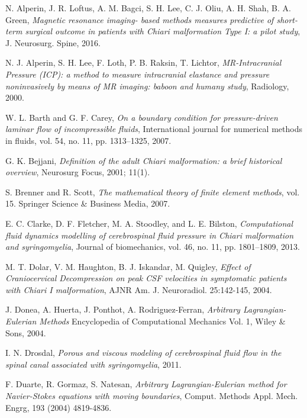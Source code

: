 \documentclass[a4paper,11pt,openright,twoside]{book}
\begin{document}
\begin{thebibliography}{100}

 N. Alperin, J. R. Loftus, A. M. Bagci, S. H. Lee, C. J. Oliu, A. H. Shah, B. A. Green, \emph{Magnetic resonance imaging- based methods measures predictive of short-term surgical outcome in patients with Chiari malformation Type I: a pilot study}, J. Neurosurg. Spine, 2016.

 N. J. Alperin, S. H. Lee, F. Loth, P. B. Raksin, T. Lichtor, \emph{MR-Intracranial Pressure (ICP): a method to measure intracranial elastance and pressure noninvasively by means of MR imaging: baboon and humany study}, Radiology, 2000.

 W. L. Barth and G. F. Carey, \emph{On a boundary condition for pressure-driven laminar flow of incompressible fluids}, International journal for numerical methods in fluids, vol. 54, no. 11, pp. 1313–1325, 2007.


 G. K. Bejjani, \emph{Definition of the adult Chiari malformation: a brief historical overview}, Neurosurg Focus, 2001; 11(1).

 S. Brenner and R. Scott, \emph{The mathematical theory of finite element methods}, vol. 15. Springer Science \& Business Media, 2007.

 E. C. Clarke, D. F. Fletcher, M. A. Stoodley, and L. E. Bilston, \emph{Computational fluid dynamics modelling of cerebrospinal fluid pressure in Chiari malformation and syringomyelia}, Journal of biomechanics, vol. 46, no. 11, pp. 1801–1809,
2013.

 M. T. Dolar, V. M. Haughton, B. J. Iskandar, M. Quigley, \emph{Effect of Craniocervical Decompression on peak CSF velocities in symptomatic patients with Chiari I malformation}, AJNR Am. J. Neuroradiol. 25:142-145, 2004.

 J. Donea, A. Huerta, J. Ponthot, A. Rodriguez-Ferran, \emph{Arbitrary Lagrangian-Eulerian Methods} Encyclopedia of Computational Mechanics Vol. 1, Wiley \& Sons, 2004.

 I. N. Drosdal, \emph{Porous and viscous modeling of cerebrospinal fluid flow in the spinal canal associated with syringomyelia}, 2011.

 F. Duarte, R. Gormaz, S. Natesan, \emph{Arbitrary Lagrangian-Eulerian method for Navier-Stokes equations with moving boundaries}, Comput. Methods Appl. Mech. Engrg, 193 (2004) 4819-4836.


\end{thebibliography}
\end{document}
